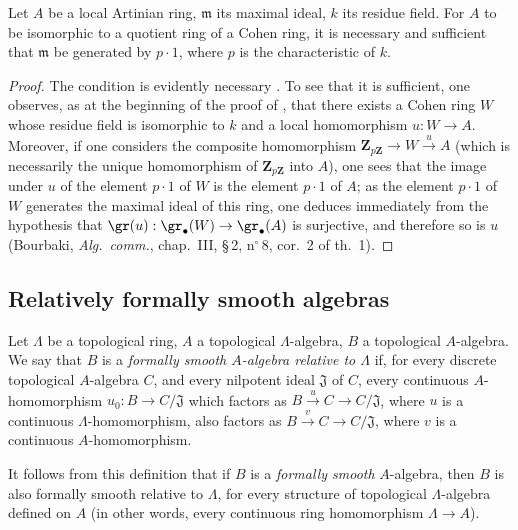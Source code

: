 \begin{proposition}[19.8.11]
\label{0.19.8.11}
Let $A$ be a local Artinian ring, $\mathfrak{m}$ its maximal ideal, $k$ its residue field.
For $A$ to be isomorphic to a quotient ring of a Cohen ring, it is necessary and sufficient that $\mathfrak{m}$ be generated by $p\cdot 1$, where $p$ is the characteristic of $k$.
\end{proposition}

\begin{proof}
The condition is evidently necessary .
To see that it is sufficient, one observes, as at the beginning of the proof of , that there exists a Cohen ring $W$ whose residue field is isomorphic to $k$ and a local homomorphism $u:W\to A$.
Moreover, if one considers the composite homomorphism $\mathbf{Z}_{p\mathbf{Z}}\to W\xrightarrow{u}A$ (which is necessarily the unique homomorphism of $\mathbf{Z}_{p\mathbf{Z}}$ into $A$), one sees that the image under $u$ of the element $p\cdot 1$ of $W$ is the element $p\cdot 1$ of $A$; as the element $p\cdot 1$ of $W$ generates the maximal ideal of this ring, one deduces immediately from the hypothesis that $\gr(u):\gr_\bullet(W)\to\gr_\bullet(A)$ is surjective, and therefore so is $u$ (Bourbaki, \emph{Alg.\ comm.}, chap.~III, \S\,2, n$^\circ$\,8, cor.~2 of th.~1).
\end{proof}

\subsection{Relatively formally smooth algebras}
\label{subsection:0.19.9}

\begin{definition}[19.9.1]
\label{0.19.9.1}
Let $\Lambda$ be a topological ring, $A$ a topological $\Lambda$-algebra, $B$ a topological $A$-algebra.
We say that $B$ is a \emph{formally smooth $A$-algebra relative to $\Lambda$} if, for every discrete topological $A$-algebra $C$, and every nilpotent ideal $\mathfrak{J}$ of $C$, every continuous $A$-homomorphism $u_0:B\to C/\mathfrak{J}$ which factors as $B\xrightarrow{u}C\to C/\mathfrak{J}$, where $u$ is a continuous $\Lambda$-homomorphism, also factors as $B\xrightarrow{v}C\to C/\mathfrak{J}$, where $v$ is a continuous $A$-homomorphism.
\end{definition}

It follows from this definition that if $B$ is a \emph{formally smooth} $A$-algebra, then $B$ is also formally smooth relative to $\Lambda$, for every structure of topological $\Lambda$-algebra defined on $A$ (in other words, every continuous ring homomorphism $\Lambda\to A$).

